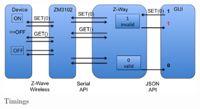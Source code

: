 \begin{figure}
\begin{center}
\includegraphics[width=0.9\textwidth]{pngs/cap11/zway2en.png}
\caption{\zway Timings}
\label{zwaytimings}
\end{center}
\end{figure}

